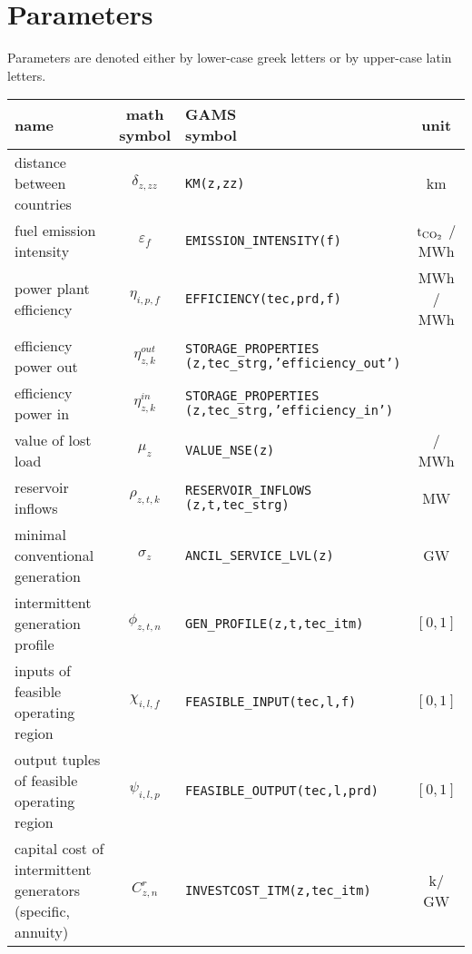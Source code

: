 \documentclass[11pt,a4paper]{article}
\begin{document}
\section{Parameters} \label{parameters}
Parameters are denoted either by lower-case greek letters or by upper-case latin letters.

\begin{longtable}{p{4.1cm} c l c}
\hline
	\textbf{name} & \makecell[l]{\textbf{math} \\ \textbf{symbol}} & \makecell[l]{\textbf{GAMS} \\\textbf{symbol}} & \textbf{unit} \\ \hline \hline
	distance between countries & $\delta_{z,zz}$ & \texttt{KM(z,zz)} & km \\ \hline
	fuel emission intensity & $\varepsilon_{f}$ & \texttt{EMISSION\_INTENSITY(f)} & $\text{t}_{\ce{CO2}}$ / MWh \\ \hline
	power plant efficiency & $\eta_{i,p,f}$ & \texttt{EFFICIENCY(tec,prd,f)} & MWh / MWh \\ \hline
	efficiency power out & $\eta^{out}_{z,k}$ & \makecell[l]{\texttt{STORAGE\_PROPERTIES} \\ \texttt{(z,tec\_strg,'efficiency\_out')}} &  \\ \hline
	efficiency power in & $\eta^{in}_{z,k}$ & \makecell[l]{\texttt{STORAGE\_PROPERTIES} \\ \texttt{(z,tec\_strg,'efficiency\_in')}} &  \\ \hline	
	value of lost load & $\mu_{z}$ & \texttt{VALUE\_NSE(z)} & \EUR / MWh \\ \hline
	reservoir inflows & $\rho_{z,t,k}$ & \makecell[l]{\texttt{RESERVOIR\_INFLOWS} \\ \texttt{(z,t,tec\_strg)}} & MW \\ \hline	
	minimal conventional generation & $\sigma_{z}$ & \texttt{ANCIL\_SERVICE\_LVL(z)} & GW \\ \hline
	intermittent generation profile & $\phi_{z,t,n}$ & \texttt{GEN\_PROFILE(z,t,tec\_itm)} & $[0,1]$ \\ \hline
	inputs of feasible operating region & $\chi_{i,l,f}$ & \texttt{FEASIBLE\_INPUT(tec,l,f)} & $[0,1]$ \\ \hline
	output tuples of feasible operating region & $\psi_{i,l,p}$ & \texttt{FEASIBLE\_OUTPUT(tec,l,prd)} & $[0,1]$ \\ \hline
	capital cost of intermittent generators (specific, annuity) & $C^{r}_{z,n}$ & \texttt{INVESTCOST\_ITM(z,tec\_itm)} & k\EUR / GW \\ \hline

\end{longtable}
\end{document}
